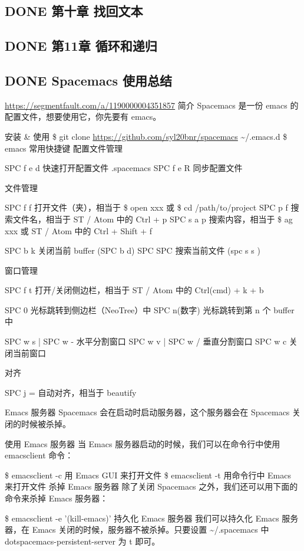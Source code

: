 \documentclass[11pt]{ctexart}
\begin{document}
\subsection{{\bfseries\sffamily DONE} 第十章 找回文本}
\label{sec:orge74f5fc}
\subsection{{\bfseries\sffamily DONE} 第11章 循环和递归}
\label{sec:org81c2cdb}
\subsection{{\bfseries\sffamily DONE} Spacemacs 使用总结}
\label{sec:org098a01e}
\url{https://segmentfault.com/a/1190000004351857}
简介
Spacemacs 是一份 emacs 的配置文件，想要使用它，你先要有 emacs。

安装 \& 使用
\$ git clone \url{https://github.com/syl20bnr/spacemacs} \textasciitilde{}/.emacs.d
\$ emacs
常用快捷键
配置文件管理

SPC f e d 快速打开配置文件 .spacemacs
SPC f e R 同步配置文件

文件管理

SPC f f 打开文件（夹），相当于 \$ open xxx 或 \$ cd /path/to/project
SPC p f 搜索文件名，相当于 ST / Atom 中的 Ctrl + p
SPC s a p 搜索内容，相当于 \$ ag xxx 或 ST / Atom 中的 Ctrl + Shift + f

SPC b k 关闭当前 buffer (SPC b d)
SPC SPC 搜索当前文件 (spc s s )

窗口管理

SPC f t 打开/关闭侧边栏，相当于 ST / Atom 中的 Ctrl(cmd) + k + b

SPC 0 光标跳转到侧边栏（NeoTree）中
SPC n(数字) 光标跳转到第 n 个 buffer 中

SPC w s | SPC w - 水平分割窗口
SPC w v | SPC w / 垂直分割窗口
SPC w c 关闭当前窗口

对齐

SPC j = 自动对齐，相当于 beautify

Emacs 服务器
Spacemacs 会在启动时启动服务器，这个服务器会在 Spacemacs 关闭的时候被杀掉。

使用 Emacs 服务器
当 Emacs 服务器启动的时候，我们可以在命令行中使用 emacsclient 命令：

\$ emacsclient -c 用 Emacs GUI 来打开文件
\$ emacsclient -t 用命令行中 Emacs 来打开文件
杀掉 Emacs 服务器
除了关闭 Spacemacs 之外，我们还可以用下面的命令来杀掉 Emacs 服务器：

\$ emacsclient -e '(kill-emacs)'
持久化 Emacs 服务器
我们可以持久化 Emacs 服务器，在 Emacs 关闭的时候，服务器不被杀掉。只要设置
\textasciitilde{}/.spacemacs 中 dotspacemacs-persistent-server 为 t 即可。
\end{document}
